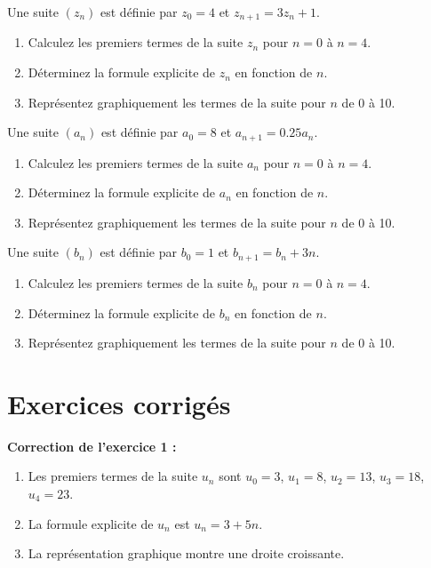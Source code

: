 \documentclass[12pt,a4paper,french]{book}
\begin{document}
\begin{exocor}
Une suite $(z_n)$ est définie par $z_0 = 4$ et $z_{n+1} = 3z_n + 1$.

\begin{enumerate}
    \item Calculez les premiers termes de la suite $z_n$ pour $n = 0$ à $n = 4$.
    \item Déterminez la formule explicite de $z_n$ en fonction de $n$.
    \item Représentez graphiquement les termes de la suite pour $n$ de 0 à 10.
\end{enumerate}
\end{exocor}

\begin{exocor}
Une suite $(a_n)$ est définie par $a_0 = 8$ et $a_{n+1} = 0.25a_n$.

\begin{enumerate}
    \item Calculez les premiers termes de la suite $a_n$ pour $n = 0$ à $n = 4$.
    \item Déterminez la formule explicite de $a_n$ en fonction de $n$.
    \item Représentez graphiquement les termes de la suite pour $n$ de 0 à 10.
\end{enumerate}
\end{exocor}

\begin{exocor}
Une suite $(b_n)$ est définie par $b_0 = 1$ et $b_{n+1} = b_n + 3n$.

\begin{enumerate}
    \item Calculez les premiers termes de la suite $b_n$ pour $n = 0$ à $n = 4$.
    \item Déterminez la formule explicite de $b_n$ en fonction de $n$.
    \item Représentez graphiquement les termes de la suite pour $n$ de 0 à 10.
\end{enumerate}
\end{exocor}

\newpage
\section{Exercices corrigés}

\begin{corrige}
\textbf{Correction de l'exercice 1 :}
\begin{enumerate}
    \item Les premiers termes de la suite $u_n$ sont $u_0 = 3$, $u_1 = 8$, $u_2 = 13$, $u_3 = 18$, $u_4 = 23$.
    \item La formule explicite de $u_n$ est $u_n = 3 + 5n$.
    \item La représentation graphique montre une droite croissante.
\end{enumerate}
\end{corrige}
\end{document}
